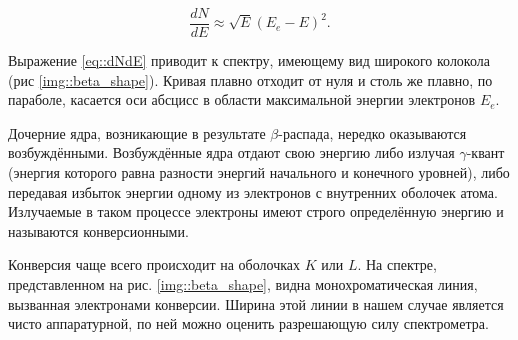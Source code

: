 \begin{equation}\label{eq::dNdE}
\frac{dN}{dE} \approx \sqrt{E}(E_e - E)^2.
\end{equation}

Выражение \eqref{eq::dNdE} приводит к спектру, имеющему вид широкого колокола (рис
\ref{img::beta_shape}). Кривая плавно отходит от нуля и столь же плавно, по параболе,
касается оси абсцисс в области максимальной энергии электронов $E_e$.

Дочерние ядра, возникающие в результате $\beta$-распада, нередко оказываются
возбуждёнными. Возбуждённые ядра отдают свою энергию либо излучая $\gamma$-квант
(энергия которого равна разности энергий начального и конечного уровней), либо
передавая избыток энергии одному из электронов с внутренних оболочек атома.
Излучаемые в таком процессе электроны имеют строго определённую энергию и
называются конверсионными.

Конверсия чаще всего происходит на оболочках $K$ или $L$. На спектре,
представленном на рис. \ref{img::beta_shape}, видна монохроматическая линия,
вызванная электронами конверсии. Ширина этой линии в нашем случае является чисто
аппаратурной, по ней можно оценить разрешающую силу спектрометра.

